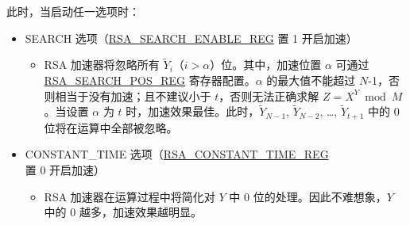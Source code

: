 \documentclass[main\_\_CN.tex]{subfiles}
\begin{document}
此时，当启动任一选项时：
\begin{itemize}
\item SEARCH 选项（\hyperref[regdesc:RSASEARCHENABLEREG]{RSA\_SEARCH\_ENABLE\_REG} 置 1 开启加速）
    \begin{itemize}
        \item RSA 加速器将忽略所有 \begin{math} \widetilde{Y}_{i} \end{math}（\begin{math} i > \alpha \end{math}）位。其中，加速位置 \begin{math} \alpha \end{math} 可通过 \hyperref[regdesc:RSASEARCHPOSREG]{RSA\_SEARCH\_POS\_REG} 寄存器配置。\begin{math} \alpha \end{math} 的最大值不能超过 \begin{math}N\end{math}-1，否则相当于没有加速；且不建议小于 \begin{math} t \end{math}，否则无法正确求解 \begin{math}Z = X^{Y} \bmod M \end{math}。当设置 \begin{math} \alpha \end{math} 为 \begin{math} t \end{math} 时，加速效果最佳。此时，\begin{math}\widetilde{Y}_{N-1}\end{math}, \begin{math}\widetilde{Y}_{N-2}\end{math}, \dots, \begin{math}\widetilde{Y}_{t+1}\end{math} 中的 0 位将在运算中全部被忽略。
    \end{itemize}  
\item CONSTANT\_TIME 选项（\hyperref[regdesc:RSACONSTANTTIMEREG]{RSA\_CONSTANT\_TIME\_REG} 置 0 开启加速）
    \begin{itemize}
        \item RSA 加速器在运算过程中将简化对 \begin{math} Y \end{math} 中 0 位的处理。因此不难想象，\begin{math} Y \end{math} 中的 0 越多，加速效果越明显。
    \end{itemize}
\end{itemize}
\end{document}
